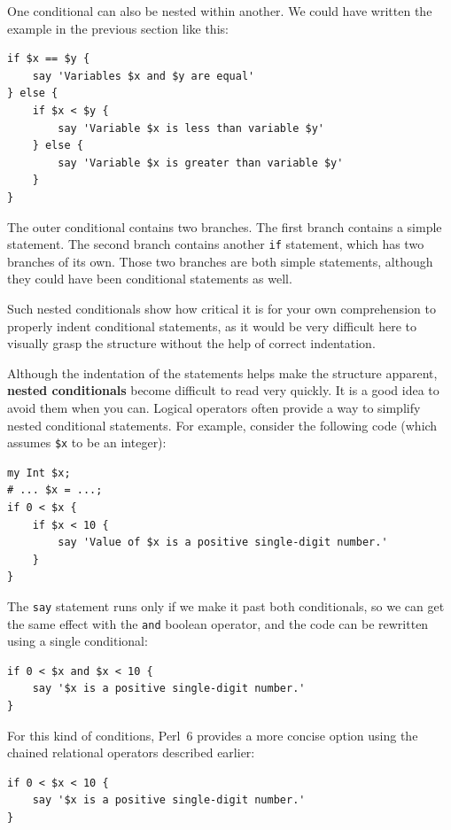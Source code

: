 One conditional can also be nested within another.  We could have
written the example in the previous section like this:

\begin{verbatim}
if $x == $y {
    say 'Variables $x and $y are equal'
} else {
    if $x < $y {
        say 'Variable $x is less than variable $y'
    } else {
        say 'Variable $x is greater than variable $y'
    }
}
\end{verbatim}
%
The outer conditional contains two branches.  The
first branch contains a simple statement.  The second branch
contains another {\tt if} statement, which has two branches of its
own.  Those two branches are both simple statements,
although they could have been conditional statements as well.

Such nested conditionals show how critical it is for your 
own comprehension to properly indent conditional statements, 
as it would be very difficult here to visually grasp the 
structure without the help of correct indentation.

Although the indentation of 
the statements helps make the structure apparent, 
{\bf nested conditionals} become difficult to read very 
quickly.  It is a good idea to avoid them when you can.
Logical operators often provide a way to simplify nested 
conditional statements.  For example, consider the 
following code (which assumes \verb'$x' to be an integer):

\begin{verbatim}
my Int $x;
# ... $x = ...;
if 0 < $x {
    if $x < 10 {
        say 'Value of $x is a positive single-digit number.'
    }
}
\end{verbatim}
%
The {\tt say} statement runs only if we make it past both
conditionals, so we can get the same effect with the {\tt and} 
boolean operator, and the code can be rewritten using a 
single conditional:

\begin{verbatim}
if 0 < $x and $x < 10 {
    say '$x is a positive single-digit number.'
}
\end{verbatim}

For this kind of conditions, Perl~6 provides a more concise option using the chained relational operators described earlier:

\begin{verbatim}
if 0 < $x < 10 {
    say '$x is a positive single-digit number.'
}
\end{verbatim}

